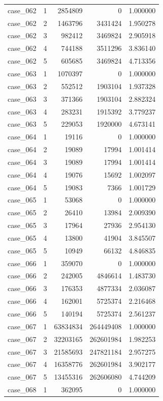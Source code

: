 \begin{longtable}{lrrrr}
case\_062 & 1 & 2854809 & 0 & 1.000000 \\
case\_062 & 2 & 1463796 & 3431424 & 1.950278 \\
case\_062 & 3 & 982412 & 3469824 & 2.905918 \\
case\_062 & 4 & 744188 & 3511296 & 3.836140 \\
case\_062 & 5 & 605685 & 3469824 & 4.713356 \\
case\_063 & 1 & 1070397 & 0 & 1.000000 \\
case\_063 & 2 & 552512 & 1903104 & 1.937328 \\
case\_063 & 3 & 371366 & 1903104 & 2.882324 \\
case\_063 & 4 & 283231 & 1915392 & 3.779237 \\
case\_063 & 5 & 229053 & 1920000 & 4.673141 \\
case\_064 & 1 & 19116 & 0 & 1.000000 \\
case\_064 & 2 & 19089 & 17994 & 1.001414 \\
case\_064 & 3 & 19089 & 17994 & 1.001414 \\
case\_064 & 4 & 19076 & 15692 & 1.002097 \\
case\_064 & 5 & 19083 & 7366 & 1.001729 \\
case\_065 & 1 & 53068 & 0 & 1.000000 \\
case\_065 & 2 & 26410 & 13984 & 2.009390 \\
case\_065 & 3 & 17964 & 27936 & 2.954130 \\
case\_065 & 4 & 13800 & 41904 & 3.845507 \\
case\_065 & 5 & 10949 & 66132 & 4.846835 \\
case\_066 & 1 & 359070 & 0 & 1.000000 \\
case\_066 & 2 & 242005 & 4846614 & 1.483730 \\
case\_066 & 3 & 176353 & 4877334 & 2.036087 \\
case\_066 & 4 & 162001 & 5725374 & 2.216468 \\
case\_066 & 5 & 140194 & 5725374 & 2.561237 \\
case\_067 & 1 & 63834834 & 264449408 & 1.000000 \\
case\_067 & 2 & 32203165 & 262601984 & 1.982253 \\
case\_067 & 3 & 21585693 & 247821184 & 2.957275 \\
case\_067 & 4 & 16358776 & 262601984 & 3.902177 \\
case\_067 & 5 & 13455316 & 262606080 & 4.744209 \\
case\_068 & 1 & 362095 & 0 & 1.000000 \\

\end{longtable}
